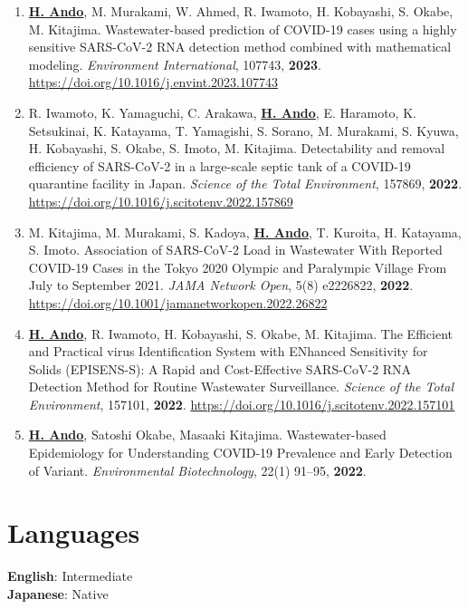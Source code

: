 \documentclass[11pt,a4paper]{article}
\begin{document}
\begin{enumerate}[label=\arabic*., series=pubcount, leftmargin=1.5em, nosep]
    \item \textbf{\underline{H. Ando}}, M. Murakami, W. Ahmed, R. Iwamoto, H. Kobayashi, S. Okabe, M. Kitajima. Wastewater-based prediction of COVID-19 cases using a highly sensitive SARS-CoV-2 RNA detection method combined with mathematical modeling. \textit{Environment International}, 107743, \textbf{2023}. \url{https://doi.org/10.1016/j.envint.2023.107743}
    \addtocounter{enumi}{-2}

    \item R. Iwamoto, K. Yamaguchi, C. Arakawa, \textbf{\underline{H. Ando}}, E. Haramoto, K. Setsukinai, K. Katayama, T. Yamagishi, S. Sorano, M. Murakami, S. Kyuwa, H. Kobayashi, S. Okabe, S. Imoto, M. Kitajima. Detectability and removal efficiency of SARS-CoV-2 in a large-scale septic tank of a COVID-19 quarantine facility in Japan. \textit{Science of the Total Environment}, 157869, \textbf{2022}. \url{https://doi.org/10.1016/j.scitotenv.2022.157869}
    \addtocounter{enumi}{-2}

    \item M. Kitajima, M. Murakami, S. Kadoya, \textbf{\underline{H. Ando}}, T. Kuroita, H. Katayama, S. Imoto. Association of SARS-CoV-2 Load in Wastewater With Reported COVID-19 Cases in the Tokyo 2020 Olympic and Paralympic Village From July to September 2021. \textit{JAMA Network Open}, 5(8) e2226822, \textbf{2022}. \url{https://doi.org/10.1001/jamanetworkopen.2022.26822}
    \addtocounter{enumi}{-2}

    \item \textbf{\underline{H. Ando}}, R. Iwamoto, H. Kobayashi, S. Okabe, M. Kitajima. The Efficient and Practical virus Identification System with ENhanced Sensitivity for Solids (EPISENS-S): A Rapid and Cost-Effective SARS-CoV-2 RNA Detection Method for Routine Wastewater Surveillance. \textit{Science of the Total Environment}, 157101, \textbf{2022}. \url{https://doi.org/10.1016/j.scitotenv.2022.157101}
    \addtocounter{enumi}{-2}

    \item \textbf{\underline{H. Ando}}, Satoshi Okabe, Masaaki Kitajima. Wastewater-based Epidemiology for Understanding COVID-19 Prevalence and Early Detection of Variant. \textit{Environmental Biotechnology}, 22(1) 91--95, \textbf{2022}.
\end{enumerate}



\section{Languages}
\textbf{English}: Intermediate \\
\textbf{Japanese}: Native
\end{document}
